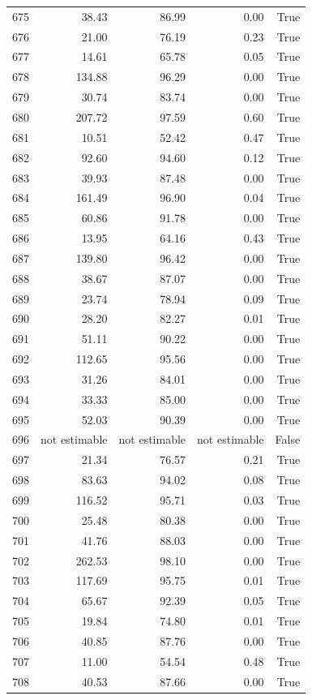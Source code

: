\begin{longtable}{rrrrr}
675 & 38.43 & 86.99 & 0.00 & True \\
676 & 21.00 & 76.19 & 0.23 & True \\
677 & 14.61 & 65.78 & 0.05 & True \\
678 & 134.88 & 96.29 & 0.00 & True \\
679 & 30.74 & 83.74 & 0.00 & True \\
680 & 207.72 & 97.59 & 0.60 & True \\
681 & 10.51 & 52.42 & 0.47 & True \\
682 & 92.60 & 94.60 & 0.12 & True \\
683 & 39.93 & 87.48 & 0.00 & True \\
684 & 161.49 & 96.90 & 0.04 & True \\
685 & 60.86 & 91.78 & 0.00 & True \\
686 & 13.95 & 64.16 & 0.43 & True \\
687 & 139.80 & 96.42 & 0.00 & True \\
688 & 38.67 & 87.07 & 0.00 & True \\
689 & 23.74 & 78.94 & 0.09 & True \\
690 & 28.20 & 82.27 & 0.01 & True \\
691 & 51.11 & 90.22 & 0.00 & True \\
692 & 112.65 & 95.56 & 0.00 & True \\
693 & 31.26 & 84.01 & 0.00 & True \\
694 & 33.33 & 85.00 & 0.00 & True \\
695 & 52.03 & 90.39 & 0.00 & True \\
696 & not estimable & not estimable & not estimable & False \\
697 & 21.34 & 76.57 & 0.21 & True \\
698 & 83.63 & 94.02 & 0.08 & True \\
699 & 116.52 & 95.71 & 0.03 & True \\
700 & 25.48 & 80.38 & 0.00 & True \\
701 & 41.76 & 88.03 & 0.00 & True \\
702 & 262.53 & 98.10 & 0.00 & True \\
703 & 117.69 & 95.75 & 0.01 & True \\
704 & 65.67 & 92.39 & 0.05 & True \\
705 & 19.84 & 74.80 & 0.01 & True \\
706 & 40.85 & 87.76 & 0.00 & True \\
707 & 11.00 & 54.54 & 0.48 & True \\
708 & 40.53 & 87.66 & 0.00 & True \\

\end{longtable}
